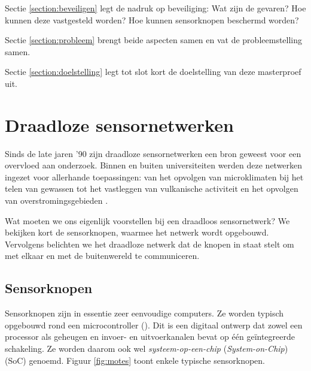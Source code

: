 Sectie \ref{section:beveiligen} legt de nadruk op beveiliging: Wat zijn de
gevaren? Hoe kunnen deze vastgesteld worden? Hoe kunnen sensorknopen beschermd
worden?

Sectie \ref{section:probleem} brengt beide aspecten samen en vat de
probleemstelling samen.

Sectie \ref{section:doelstelling} legt tot slot kort de doelstelling van deze
masterproef uit.

\section{Draadloze sensornetwerken}
\label{section:wsn}

Sinds de late jaren '90 zijn draadloze sensornetwerken een bron geweest voor
een overvloed aan onderzoek. Binnen en buiten universiteiten werden deze
netwerken ingezet voor allerhande toepassingen: van het opvolgen van
microklimaten bij het telen van gewassen \citep{baggio2005wireless} tot het
vastleggen van vulkanische activiteit \citep{werner2005monitoring} en het
opvolgen van overstromingsgebieden \citep{hughes2006gridstix}.

Wat moeten we ons eigenlijk voorstellen bij een draadloos sensornetwerk? We
bekijken kort de sensorknopen, waarmee het netwerk wordt opgebouwd. Vervolgens
belichten we het draadloze netwerk dat de knopen in staat stelt om met elkaar
en met de buitenwereld te communiceren.

\subsection{Sensorknopen}

Sensorknopen zijn in essentie zeer eenvoudige computers. Ze worden typisch
opgebouwd rond een microcontroller (\mcu). Dit is een digitaal ontwerp dat
zowel een processor als geheugen en invoer- en uitvoerkanalen bevat op \'e\'en
ge\"integreerde schakeling. Ze worden daarom ook wel \emph{systeem-op-een-chip}
(\emph{System-on-Chip}) (SoC) genoemd. Figuur \ref{fig:motes} toont enkele
typische sensorknopen.

